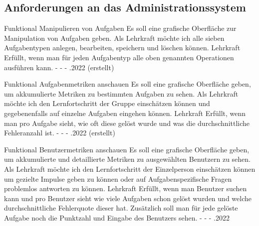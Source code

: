 \subsection{Anforderungen an das Administrationssystem}
\begin{myreq}
  \threeinline
    {}
    {\reqtype Funktional}
    {\reqevent Manipulieren von Aufgaben}
  \reqdesc Es soll eine grafische Oberfläche zur Manipulation von Aufgaben geben.
  \reqrat Als Lehrkraft möchte ich alle sieben Aufgabentypen anlegen, bearbeiten, speichern und löschen können.
  \reqorig Lehrkraft
  \reqfit Erfüllt, wenn man für jeden Aufgabentyp alle oben genannten Operationen ausführen kann.
  \twoinline
    {}
    {}
  \twoinline
  {\reqdep -}
  {\reqconf -}
  \reqmater -
  .2022 (erstellt) 
\end{myreq}

\begin{myreq}
  \threeinline
    {}
    {\reqtype Funktional}
    {\reqevent Aufgabenmetriken anschauen}
  \reqdesc Es soll eine grafische Oberfläche geben, um akkumulierte Metriken zu bestimmten Aufgaben zu sehen.
  \reqrat Als Lehrkraft möchte ich den Lernfortschritt der Gruppe einschätzen können und gegebenenfalls auf einzelne Aufgaben eingehen können.
  \reqorig Lehrkraft
  \reqfit Erfüllt, wenn man pro Aufgabe sieht, wie oft diese gelöst wurde und was die durchschnittliche Fehleranzahl ist.
  \twoinline
    {}
    {}
  \twoinline
  {\reqdep -}
  {\reqconf -}
  \reqmater -
  .2022 (erstellt)
\end{myreq}

\begin{myreq}
  \threeinline
    {}
    {\reqtype Funktional}
    {\reqevent Benutzermetriken anschauen}
  \reqdesc Es soll eine grafische Oberfläche geben, um akkumulierte und detaillierte Metriken zu ausgewählten Benutzern zu sehen.
  \reqrat Als Lehrkraft möchte ich den Lernfortschritt der Einzelperson einschätzen können um gezielte Impulse geben zu können oder auf Aufgabenspezifische Fragen problemlos antworten zu können.
  \reqorig Lehrkraft
  \reqfit Erfüllt, wenn man Benutzer suchen kann und pro Benutzer sieht wie viele Aufgaben schon gelöst wurden und welche durchschnittliche Fehlerquote dieser hat. Zusätzlich soll man für jede gelöste Aufgabe noch die Punktzahl und Eingabe des Benutzers sehen.
  \twoinline
    {}
    {}
  \twoinline
  {\reqdep -}
  {\reqconf -}
  \reqmater -
  .2022
\end{myreq}


